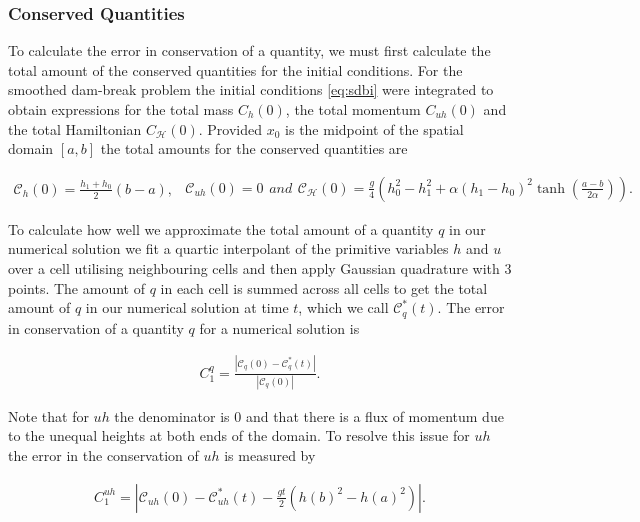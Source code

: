\documentclass[times]{elsarticle}
\begin{document}
\subsubsection{Conserved Quantities}
To calculate the error in conservation of a quantity, we must first calculate the total amount of the conserved quantities for the initial conditions. For the smoothed dam-break problem the initial conditions \eqref{eq:sdbi} were integrated to obtain expressions for the total mass $C_{h}(0)$, the total momentum $C_{uh}(0)$ and the total Hamiltonian $C_{\mathcal{H}}(0)$. Provided $x_0$ is the midpoint of the spatial domain $\left[a,b \right]$ the total amounts for the conserved quantities are
\begin{linenomath*}
	\begin{subequations}
		\begin{gather*}
		\mathcal{C}_{h}(0) = \frac{h_1 + h_0}{2}\left(b- a\right),
		\label{eq:Chdef}
		\end{gather*}
		\begin{gather*}
		\mathcal{C}_{uh}(0) = 0
		\label{eq:Cuhdef}
		\end{gather*}
		and
		\begin{gather*}
		\mathcal{C}_{\mathcal{H}}(0) = \frac{g}{4} \left(h_0^2 - h_1^2 + \alpha\left(h_1 - h_0\right)^2\tanh\left(\frac{a - b}{2 \alpha}\right)\right).
		\label{eq:CHdef}
		\end{gather*}
		\label{eq:Canalyticvalues}	
	\end{subequations}
\end{linenomath*}

To calculate how well we approximate the total amount of a quantity $q$ in our numerical solution we fit a quartic interpolant of the primitive variables $h$ and $u$ over a cell utilising neighbouring cells and then apply Gaussian quadrature with 3 points. The amount of $q$ in each cell is summed across all cells to get the total amount of $q$ in our numerical solution at time $t$, which we call $\mathcal{C}^*_{q}(t)$. The error in conservation of a quantity $q$ for a numerical solution is
\begin{linenomath*}
	\begin{gather}
	C_1^q = \frac{\left| \mathcal{C}_{q}(0) - \mathcal{C}^*_{q}(t) \right| }{\left|\mathcal{C}_{q}(0)\right|}.
	\end{gather}
\end{linenomath*}
Note that for $uh$ the denominator is $0$ and that there is a flux of momentum due to the unequal heights at both ends of the domain. To resolve this issue for $uh$ the error in the conservation of $uh$ is measured by
\begin{linenomath*}
	\begin{gather}
	C_1^{uh} = \left| \mathcal{C}_{uh}(0) - \mathcal{C}^*_{uh}(t) - \frac{gt}{2}\left(h(b)^2 - h(a)^2\right)\right|  .
	\label{eq:C1def}
	\end{gather}
\end{linenomath*}
\end{document}
